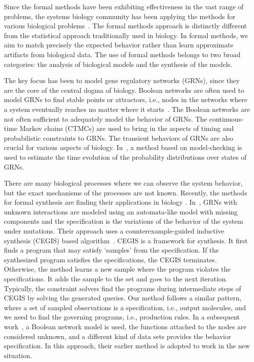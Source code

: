\documentclass{llncs}
\begin{document}

Since the formal methods have been exhibiting effectiveness in the vast
range of problems, the
systems biology community has been applying the methods for various
biological problems~\cite{fisher2007executable}.
The formal methods approach is distinctly different from the statistical
approach traditionally used in biology.
In formal methods, we aim to match precisely the expected behavior rather
than learn approximate artifacts from biological data.
The use of formal methods belongs to two broad categories:
the analysis of biological models and the synthesis of the models.

The key focus has been to model gene regulatory networks (GRNs), since
they are the core of the central dogma of biology.
Boolean networks are often used to model
GRNs to find stable points or attractors, i.e., nodes in the networks
where a system eventually reaches no matter where it starts~\cite{wang2012BooleanOverview}.
The Boolean networks are not often sufficient to adequately model the behavior
of GRNs.
The continuous-time Markov chains (CTMCs) are used to bring in the aspects of
timing and probabilistic constraints to GRNs.
The transient behaviors of GRNs are also crucial for various aspects
of biology.
In~\cite{delayedCTMC}, a method based on
model-checking is used to estimate the time evolution of the probability
distributions over states of GRNs.


There are many biological processes where we can observe the system behavior,
but the exact mechanisms of the processes are not known.
%
Recently, the methods for formal synthesis are finding their applications in biology
\cite{dunn2014defining,xuPluripotency,booleanModelKarp13,paoletti2014analyzing}.
%
In~\cite{koksal2013synthesis},
GRNs with unknown interactions are modeled using
an automata-like model with missing components
and the specification is the variations of the behavior of the system under mutations.
Their approach uses a counterexample-guided inductive synthesis (CEGIS) based algorithm~\cite{cegis}.
CEGIS is a framework for synthesis. It first finds a program that may satisfy `samples' from
the specification. If the synthesized program satisfies the specifications, the CEGIS terminates.
Otherwise, the method learns a new sample where the program violates the specifications.
It adds the sample to the set and goes to the next iteration.
Typically, the constraint solvers find the programs during intermediate steps of CEGIS by
solving the generated queries.
%
Our method follows a similar pattern, where
a set of sampled observations is a specification, i.e., output molecules,
and we need to find the governing programs, i.e., production rules.
%
In a subsequent work~\cite{fisher2015synthesising}, a Boolean network model is used,
the functions attached to the nodes are considered unknown, and
a different kind of data sets provides the behavior specification.
In this approach, their earlier method is adopted to work in the new situation.
%
\end{document}
